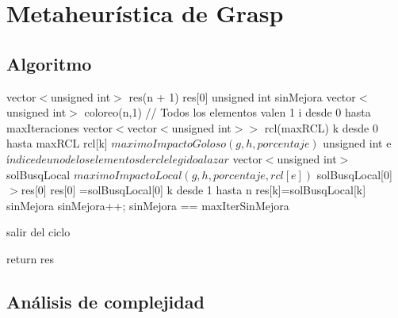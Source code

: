 \section{Metaheurística de Grasp}

\subsection{Algoritmo}

\begin{algorithm}[H]
\caption{} 
\begin{codebox}

\li vector$<$unsigned int$>$ res(n + 1)
\li res[0] 
\li unsigned int sinMejora 
\li
\li vector$<$unsigned int$>$ coloreo(n,1) // Todos los elementos valen 1
\li
\li \For i desde 0 hasta maxIteraciones \Do 
\li vector$<$vector$<$unsigned int$>>$ rcl(maxRCL)
\li 	\For k desde 0 hasta maxRCL \Do
\li 		rcl[k] \gets $maximoImpactoGoloso(g,h, porcentaje)$
		\End
\li
\li		unsigned int e \gets $índice de uno de los elementos de rcl elegido al azar$
\li
\li 	vector$<$unsigned int$>$ solBusqLocal \gets $maximoImpactoLocal(g,h,porcentaje,rcl[e])$
\li
\li 	\If solBusqLocal[0]$>$res[0] \Do
\li			res[0] =solBusqLocal[0]
\li
\li			\For k desde 1 hasta n \Do
\li				res[k]=solBusqLocal[k]
\li
			\End
\li			sinMejora
\li		\Else \Do
\li			sinMejora++;
\li         \If sinMejora == maxIterSinMejora \Do
            
\li                salir del ciclo
            
            \End
        \End

	\End	
\li
\li return res
\End
\end{codebox}
\end{algorithm}

\subsection{Análisis de complejidad}

